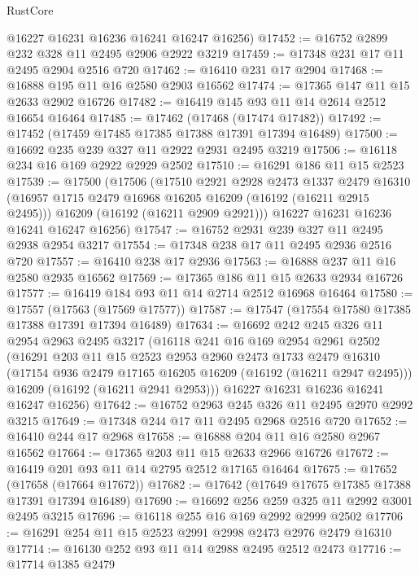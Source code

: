 \begin{lexlean}{RustCore}
\begin{coremodule}
      @16227
      @16231
      @16236
      @16241
      @16247
      @16256)
@17452 := @16752 @2899 @232 @328 @11 @2495 @2906 @2922 @3219
@17459 := @17348 @231 @17 @11 @2495 @2904 @2516 @720
@17462 := @16410 @231 @17 @2904
@17468 := @16888 @195 @11 @16 @2580 @2903 @16562
@17474 := @17365 @147 @11 @15 @2633 @2902 @16726
@17482 := @16419 @145 @93 @11 @14 @2614 @2512 @16654 @16464
@17485 := @17462 (@17468 (@17474 @17482))
@17492 := @17452 (@17459 @17485 @17385 @17388 @17391 @17394 @16489)
@17500 := @16692 @235 @239 @327 @11 @2922 @2931 @2495 @3219
@17506 := @16118 @234 @16 @169 @2922 @2929 @2502
@17510 := @16291 @186 @11 @15 @2523
@17539 := @17500
    (@17506
      (@17510
        @2921
        @2928
        @2473
        @1337
        @2479
        @16310
        (@16957 @1715 @2479 @16968 @16205 @16209 (@16192 (@16211 @2915 @2495)))
        @16209
        (@16192 (@16211 @2909 @2921)))
      @16227
      @16231
      @16236
      @16241
      @16247
      @16256)
@17547 := @16752 @2931 @239 @327 @11 @2495 @2938 @2954 @3217
@17554 := @17348 @238 @17 @11 @2495 @2936 @2516 @720
@17557 := @16410 @238 @17 @2936
@17563 := @16888 @237 @11 @16 @2580 @2935 @16562
@17569 := @17365 @186 @11 @15 @2633 @2934 @16726
@17577 := @16419 @184 @93 @11 @14 @2714 @2512 @16968 @16464
@17580 := @17557 (@17563 (@17569 @17577))
@17587 := @17547 (@17554 @17580 @17385 @17388 @17391 @17394 @16489)
@17634 := @16692
    @242
    @245
    @326
    @11
    @2954
    @2963
    @2495
    @3217
    (@16118
      @241
      @16
      @169
      @2954
      @2961
      @2502
      (@16291
        @203
        @11
        @15
        @2523
        @2953
        @2960
        @2473
        @1733
        @2479
        @16310
        (@17154 @936 @2479 @17165 @16205 @16209 (@16192 (@16211 @2947 @2495)))
        @16209
        (@16192 (@16211 @2941 @2953)))
      @16227
      @16231
      @16236
      @16241
      @16247
      @16256)
@17642 := @16752 @2963 @245 @326 @11 @2495 @2970 @2992 @3215
@17649 := @17348 @244 @17 @11 @2495 @2968 @2516 @720
@17652 := @16410 @244 @17 @2968
@17658 := @16888 @204 @11 @16 @2580 @2967 @16562
@17664 := @17365 @203 @11 @15 @2633 @2966 @16726
@17672 := @16419 @201 @93 @11 @14 @2795 @2512 @17165 @16464
@17675 := @17652 (@17658 (@17664 @17672))
@17682 := @17642 (@17649 @17675 @17385 @17388 @17391 @17394 @16489)
@17690 := @16692 @256 @259 @325 @11 @2992 @3001 @2495 @3215
@17696 := @16118 @255 @16 @169 @2992 @2999 @2502
@17706 := @16291 @254 @11 @15 @2523 @2991 @2998 @2473 @2976 @2479 @16310
@17714 := @16130 @252 @93 @11 @14 @2988 @2495 @2512 @2473
@17716 := @17714 @1385 @2479

\end{coremodule}
\end{lexlean}
